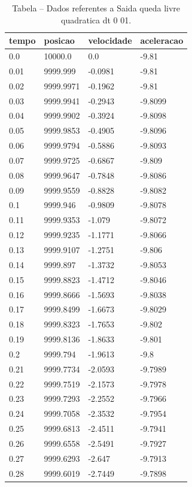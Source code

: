 \begin{table}[H]
\centering
\caption{Tabela – Dados referentes a Saida queda livre quadratica dt 0 01.}
\label{tab:saida_queda_livre_quadratica_dt_0_01}
\begin{tabular}{llll}
\toprule
tempo & posicao & velocidade & aceleracao \\
\midrule
0.0 & 10000.0 & 0.0 & -9.81 \\
0.01 & 9999.999 & -0.0981 & -9.81 \\
0.02 & 9999.9971 & -0.1962 & -9.81 \\
0.03 & 9999.9941 & -0.2943 & -9.8099 \\
0.04 & 9999.9902 & -0.3924 & -9.8098 \\
0.05 & 9999.9853 & -0.4905 & -9.8096 \\
0.06 & 9999.9794 & -0.5886 & -9.8093 \\
0.07 & 9999.9725 & -0.6867 & -9.809 \\
0.08 & 9999.9647 & -0.7848 & -9.8086 \\
0.09 & 9999.9559 & -0.8828 & -9.8082 \\
0.1 & 9999.946 & -0.9809 & -9.8078 \\
0.11 & 9999.9353 & -1.079 & -9.8072 \\
0.12 & 9999.9235 & -1.1771 & -9.8066 \\
0.13 & 9999.9107 & -1.2751 & -9.806 \\
0.14 & 9999.897 & -1.3732 & -9.8053 \\
0.15 & 9999.8823 & -1.4712 & -9.8046 \\
0.16 & 9999.8666 & -1.5693 & -9.8038 \\
0.17 & 9999.8499 & -1.6673 & -9.8029 \\
0.18 & 9999.8323 & -1.7653 & -9.802 \\
0.19 & 9999.8136 & -1.8633 & -9.801 \\
0.2 & 9999.794 & -1.9613 & -9.8 \\
0.21 & 9999.7734 & -2.0593 & -9.7989 \\
0.22 & 9999.7519 & -2.1573 & -9.7978 \\
0.23 & 9999.7293 & -2.2552 & -9.7966 \\
0.24 & 9999.7058 & -2.3532 & -9.7954 \\
0.25 & 9999.6813 & -2.4511 & -9.7941 \\
0.26 & 9999.6558 & -2.5491 & -9.7927 \\
0.27 & 9999.6293 & -2.647 & -9.7913 \\
0.28 & 9999.6019 & -2.7449 & -9.7898 \\

\end{tabular}
\end{table}
